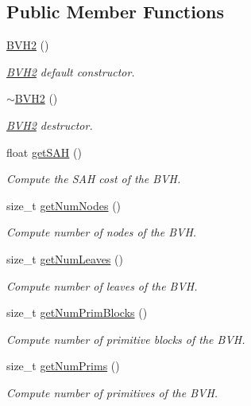 \subsection*{Public Member Functions}
\begin{DoxyCompactItemize}
\item 
\hyperlink{classembree_1_1_b_v_h2_a3c00b1dd6bebcead8c2f0b5ffb3b4a2f}{BVH2} ()
\begin{DoxyCompactList}\small\item\em \hyperlink{classembree_1_1_b_v_h2}{BVH2} default constructor. \item\end{DoxyCompactList}\item 
\hyperlink{classembree_1_1_b_v_h2_a3636a02edac0e06152b199036dfdd4c7}{$\sim$BVH2} ()
\begin{DoxyCompactList}\small\item\em \hyperlink{classembree_1_1_b_v_h2}{BVH2} destructor. \item\end{DoxyCompactList}\item 
float \hyperlink{classembree_1_1_b_v_h2_a960e1eed2f83e079720620d1b2a6635d}{getSAH} ()
\begin{DoxyCompactList}\small\item\em Compute the SAH cost of the BVH. \item\end{DoxyCompactList}\item 
size\_\-t \hyperlink{classembree_1_1_b_v_h2_a06658e48daaaac4975abb1dee5505a64}{getNumNodes} ()
\begin{DoxyCompactList}\small\item\em Compute number of nodes of the BVH. \item\end{DoxyCompactList}\item 
size\_\-t \hyperlink{classembree_1_1_b_v_h2_a0b602c268443e8e6ab743c95e2d5a291}{getNumLeaves} ()
\begin{DoxyCompactList}\small\item\em Compute number of leaves of the BVH. \item\end{DoxyCompactList}\item 
size\_\-t \hyperlink{classembree_1_1_b_v_h2_a7ba110cac4a00a722cb1ef1694cbc2bc}{getNumPrimBlocks} ()
\begin{DoxyCompactList}\small\item\em Compute number of primitive blocks of the BVH. \item\end{DoxyCompactList}\item 
size\_\-t \hyperlink{classembree_1_1_b_v_h2_a6d96a57fc74d7b00ceb185fe39a8f424}{getNumPrims} ()
\begin{DoxyCompactList}\small\item\em Compute number of primitives of the BVH. \item\end{DoxyCompactList}\end{DoxyCompactItemize}
